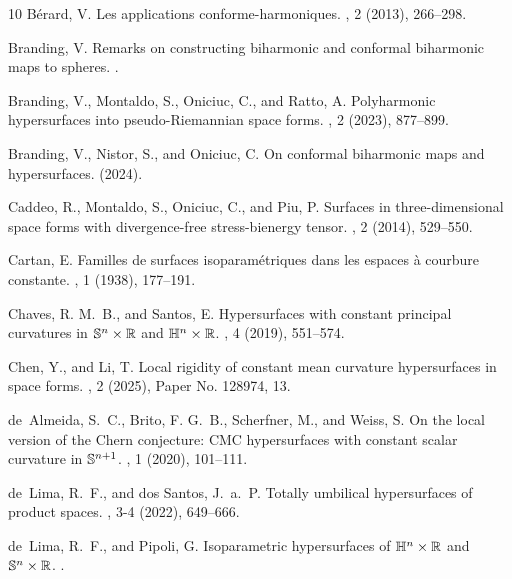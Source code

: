 \documentclass[11pt,leqno]{amsart}
\theoremstyle{plain}
\theoremstyle{definition}
\numberwithin{equation}{section}
\numberwithin{equation}{section}
\begin{document}
{\begin{thebibliography}{10}
{\sc B\'erard, V.}
\newblock Les applications conforme-harmoniques.
, 2 (2013), 266--298.

{\sc Branding, V.}
\newblock Remarks on constructing biharmonic and conformal biharmonic maps to
  spheres.
.

{\sc Branding, V., Montaldo, S., Oniciuc, C., and Ratto, A.}
\newblock Polyharmonic hypersurfaces into pseudo-{R}iemannian space forms.
, 2 (2023), 877--899.

{\sc Branding, V., Nistor, S., and Oniciuc, C.}
\newblock On conformal biharmonic maps and hypersurfaces.
 (2024).

{\sc Caddeo, R., Montaldo, S., Oniciuc, C., and Piu, P.}
\newblock Surfaces in three-dimensional space forms with divergence-free
  stress-bienergy tensor.
, 2 (2014), 529--550.

{\sc Cartan, E.}
\newblock Familles de surfaces isoparam\'{e}triques dans les espaces \`a
  courbure constante.
, 1 (1938), 177--191.

{\sc Chaves, R. M.~B., and Santos, E.}
\newblock Hypersurfaces with constant principal curvatures in {$\Bbb
  S^n\times\Bbb R$} and {$\Bbb H^n\times\Bbb R$}.
, 4 (2019), 551--574.

{\sc Chen, Y., and Li, T.}
\newblock Local rigidity of constant mean curvature hypersurfaces in space
  forms.
, 2 (2025), Paper No. 128974, 13.

{\sc de~Almeida, S.~C., Brito, F. G.~B., Scherfner, M., and Weiss, S.}
\newblock On the local version of the {C}hern conjecture: {CMC} hypersurfaces
  with constant scalar curvature in {$\Bbb S^{n+1}$}.
, 1 (2020), 101--111.

{\sc de~Lima, R.~F., and dos Santos, J.~a.~P.}
\newblock Totally umbilical hypersurfaces of product spaces.
, 3-4 (2022), 649--666.

{\sc de~Lima, R.~F., and Pipoli, G.}
\newblock Isoparametric hypersurfaces of {$\Bbb H^n\times\Bbb R$} and {$\Bbb
  S^n\times\Bbb R$}.
.


\end{thebibliography}}
\end{document}
